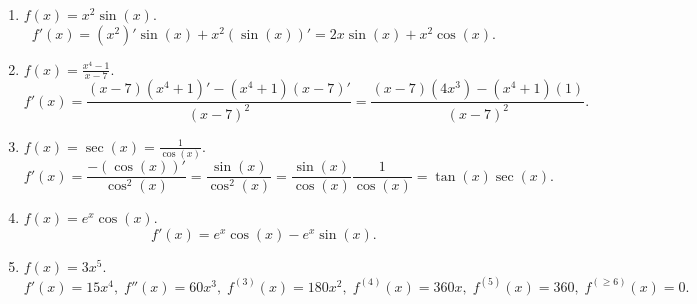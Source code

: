 \begin{Example}{}{}
    \begin{enumerate}[(1)]
        \item $ f(x)=x^2\sin(x) $.
              \[ f'(x)=(x^2)'\sin(x)+x^2(\sin(x))'=2x\sin(x)+x^2\cos(x). \]
        \item $ f(x)=\frac{x^4-1}{x-7} $.
              \[ f'(x)=\frac{(x-7)(x^4+1)'-(x^4+1)(x-7)'}{(x-7)^2}=\frac{(x-7)(4x^3)-(x^4+1)(1)}{(x-7)^2}. \]
        \item $ f(x)=\sec(x)=\frac{1}{\cos(x)} $.
              \[ f'(x)=\frac{-(\cos(x))'}{\cos^2(x)}=\frac{\sin(x)}{\cos^2(x)}=\frac{\sin(x)}{\cos(x)}\frac{1}{\cos(x)}=\tan(x)\sec(x). \]
        \item $ f(x)=e^x\cos(x) $.
              \[ f'(x)=e^x\cos(x)-e^x\sin(x). \]
        \item $ f(x)=3x^5 $.
              \[ f'(x)=15x^4,\; f''(x)=60x^3,\; f^{(3)}(x)=180x^2,\; f^{(4)}(x)=360x,\; f^{(5)}(x)=360,\; f^{(\ge 6)}(x)=0. \]
    \end{enumerate}
\end{Example}
